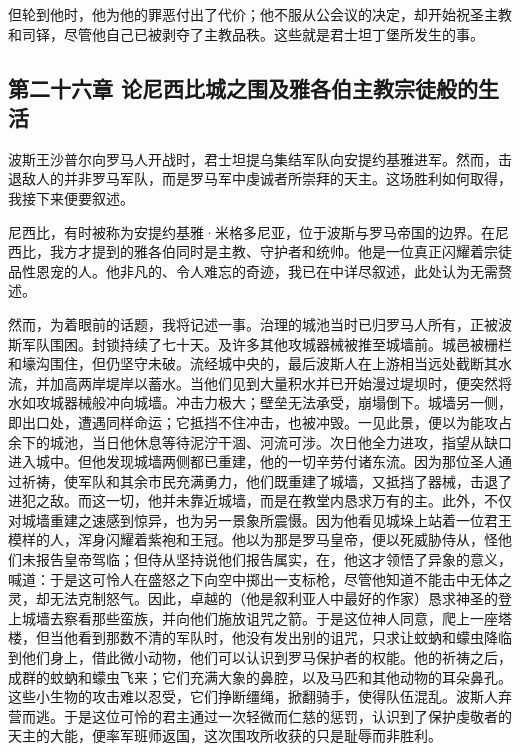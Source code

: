 但轮到他时，他为他的罪恶付出了代价；他不服从公会议的决定，却开始祝圣主教和司铎，尽管他自己已被剥夺了主教品秩。这些就是君士坦丁堡所发生的事。\par


\subsection{第二十六章 论尼西比城之围及雅各伯主教宗徒般的生活}

波斯王沙普尔向罗马人开战时，君士坦提乌集结军队向安提约基雅进军。然而，击退敌人的并非罗马军队，而是罗马军中虔诚者所崇拜的天主。这场胜利如何取得，我接下来便要叙述。\par

尼西比，有时被称为安提约基雅·米格多尼亚，位于波斯与罗马帝国的边界。在尼西比，我方才提到的雅各伯同时是主教、守护者和统帅。他是一位真正闪耀着宗徒品性恩宠的人。他非凡的、令人难忘的奇迹，我已在中详尽叙述，此处认为无需赘述。\par

然而，为着眼前的话题，我将记述一事。治理的城池当时已归罗马人所有，正被波斯军队围困。封锁持续了七十天。及许多其他攻城器械被推至城墙前。城邑被栅栏和壕沟围住，但仍坚守未破。流经城中央的，最后波斯人在上游相当远处截断其水流，并加高两岸堤岸以蓄水。当他们见到大量积水并已开始漫过堤坝时，便突然将水如攻城器械般冲向城墙。冲击力极大；壁垒无法承受，崩塌倒下。城墙另一侧，即出口处，遭遇同样命运；它抵挡不住冲击，也被冲毁。一见此景，便以为能攻占余下的城池，当日他休息等待泥泞干涸、河流可涉。次日他全力进攻，指望从缺口进入城中。但他发现城墙两侧都已重建，他的一切辛劳付诸东流。因为那位圣人通过祈祷，使军队和其余市民充满勇力，他们既重建了城墙，又抵挡了器械，击退了进犯之敌。而这一切，他并未靠近城墙，而是在教堂内恳求万有的主。此外，不仅对城墙重建之速感到惊异，也为另一景象所震慑。因为他看见城垛上站着一位君王模样的人，浑身闪耀着紫袍和王冠。他以为那是罗马皇帝，便以死威胁侍从，怪他们未报告皇帝驾临；但侍从坚持说他们报告属实，在，他这才领悟了异象的意义，喊道：于是这可怜人在盛怒之下向空中掷出一支标枪，尽管他知道不能击中无体之灵，却无法克制怒气。因此，卓越的（他是叙利亚人中最好的作家）恳求神圣的登上城墙去察看那些蛮族，并向他们施放诅咒之箭。于是这位神人同意，爬上一座塔楼，但当他看到那数不清的军队时，他没有发出别的诅咒，只求让蚊蚋和蠓虫降临到他们身上，借此微小动物，他们可以认识到罗马保护者的权能。他的祈祷之后，成群的蚊蚋和蠓虫飞来；它们充满大象的鼻腔，以及马匹和其他动物的耳朵鼻孔。这些小生物的攻击难以忍受，它们挣断缰绳，掀翻骑手，使得队伍混乱。波斯人弃营而逃。于是这位可怜的君主通过一次轻微而仁慈的惩罚，认识到了保护虔敬者的天主的大能，便率军班师返国，这次围攻所收获的只是耻辱而非胜利。\par

